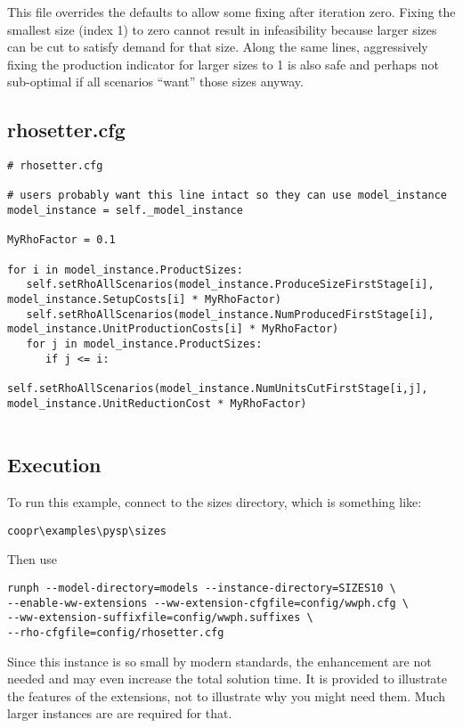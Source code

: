 This file overrides the defaults to allow some fixing after iteration zero. Fixing the smallest
size (index 1) to zero cannot result in infeasibility because larger sizes can be cut to
satisfy demand for that size. Along the same lines, aggressively fixing the
production indicator for larger sizes to 1 is also
safe and perhaps not sub-optimal if all scenarios ``want'' those sizes anyway.

\subsection{rhosetter.cfg}

\begin{verbatim}
# rhosetter.cfg

# users probably want this line intact so they can use model_instance
model_instance = self._model_instance

MyRhoFactor = 0.1

for i in model_instance.ProductSizes:
   self.setRhoAllScenarios(model_instance.ProduceSizeFirstStage[i], model_instance.SetupCosts[i] * MyRhoFactor)
   self.setRhoAllScenarios(model_instance.NumProducedFirstStage[i], model_instance.UnitProductionCosts[i] * MyRhoFactor)
   for j in model_instance.ProductSizes:
      if j <= i: 
         self.setRhoAllScenarios(model_instance.NumUnitsCutFirstStage[i,j], model_instance.UnitReductionCost * MyRhoFactor)


\end{verbatim}

\subsection{Execution}

To run this example, connect to the sizes directory, which is something like:
\begin{verbatim}
coopr\examples\pysp\sizes
\end{verbatim}

Then use
\begin{verbatim}
runph --model-directory=models --instance-directory=SIZES10 \
--enable-ww-extensions --ww-extension-cfgfile=config/wwph.cfg \
--ww-extension-suffixfile=config/wwph.suffixes \
--rho-cfgfile=config/rhosetter.cfg
\end{verbatim}

Since this instance is so small by modern standards, the enhancement are not needed and may even increase the total solution
time. It is provided to illustrate the features of the extensions, not to illustrate why you might need them. Much larger instances are are required for that.

